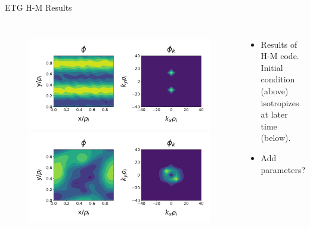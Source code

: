 \documentclass[aspectratio=43]{beamer}
\begin{document}
   \begin{frame}{ETG H-M Results}
      \begin{columns}
            \begin{figure}
               \vspace*{-.5cm}
               \includegraphics[height=.43\textheight, width=\textwidth]{Images/hmPhiETG_init.pdf}
               \includegraphics[height=.43\textheight, width=\textwidth]{Images/hmPhiETG_iso.pdf}
            \end{figure}
            \begin{itemize}
               \vspace*{-1cm}
               \item Results of H-M code. Initial condition (above) isotropizes at later time (below).
               \item Add parameters?
            \end{itemize}
      \end{columns}
   \end{frame}
\end{document}
